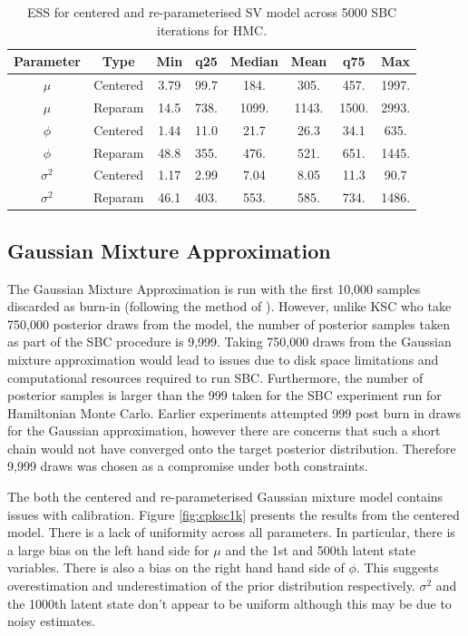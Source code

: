 \documentclass[12pt, a4paper]{article}
\begin{document}
    \begin{table}[H]
        \centering
        \begin{tabular}{|c|c|c|c|c|c|c|c|} \hline 
        Parameter &  Type&Min& q25&  Median& Mean & q75&Max\\ \hline 
        $\mu$&  Centered&3.79 & 99.7 & 184. & 305. & 457. & 1997.  \\
     $\mu$&  Reparam&14.5 & 738. & 1099. & 1143. & 1500. & 2993.  \\\hline 
     $\phi$&  Centered&1.44 & 11.0 & 21.7 & 26.3 & 34.1 & 635.  \\
     $\phi$&  Reparam&48.8 & 355. & 476. & 521. & 651. & 1445.   \\ \hline 
     $\sigma^2$&  Centered& 1.17 & 2.99 & 7.04 & 8.05 & 11.3 & 90.7 \\ 
     $\sigma^2$&  Reparam&46.1 & 403. & 553. & 585. & 734. & 1486. \\ \hline
        \end{tabular}
        \caption{ESS for centered and re-parameterised SV model across 5000 SBC iterations for HMC.}
        \label{tab:hmcess}
    \end{table}

    \subsection{Gaussian Mixture Approximation}
    The Gaussian Mixture Approximation is run with the first 10,000 samples discarded as burn-in (following the method of \citet{kim1998stochastic}). However, unlike KSC who take 750,000 posterior draws from the model, the number of posterior samples taken as part of the SBC procedure is 9,999. Taking 750,000 draws from the Gaussian mixture approximation would lead to issues due to disk space limitations and computational resources required to run SBC. Furthermore, the number of posterior samples is larger than the 999 taken for the SBC experiment run for Hamiltonian Monte Carlo. Earlier experiments attempted 999 post burn in draws for the Gaussian approximation, however there are concerns that such a short chain would not have converged onto the target posterior distribution. Therefore 9,999 draws was chosen as a compromise under both constraints. 

    The both the centered and re-parameterised Gaussian mixture model contains issues with calibration. Figure \ref{fig:cpksc1k} presents the results from the centered model. There is a lack of uniformity across all parameters. In particular, there is a large bias on the left hand side for $\mu$ and the 1st and 500th latent state variables. There is also a bias on the right hand hand side of $\phi$. This suggests overestimation and underestimation of the prior distribution respectively. $\sigma^2$ and the 1000th latent state don't appear to be uniform although this may be due to noisy estimates.
\end{document}
